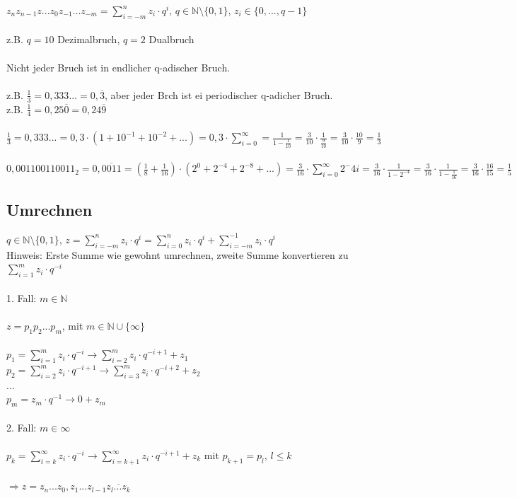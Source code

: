 \documentclass{llncs}
\begin{document}
$z_{n}z_{n-1}z...z_{0}z_{-1}...z_{-m}= \sum_{i=-m}^{n} z_i \cdot q^{i}$, $q \in \mathbb{N} \setminus \{0,1\}$, $z_i \in \{0,...,q-1\}$\\
\\
z.B. $q=10$ Dezimalbruch, $q=2$ Dualbruch\\
\\
Nicht jeder Bruch ist in endlicher q-adischer Bruch.\\
\\
z.B. $\frac{1}{3} = 0,333... = 0,\overline{3}$, aber jeder Brch ist ei periodischer q-adicher Bruch.\\
z.B. $\frac{1}{4} = 0,25\overline{0} = 0,24\overline{9}$\\
\\
$\frac{1}{3} = 0,333... = 0,3 \cdot (1 + 10^{-1}+10^{-2}+...) = 0,3 \cdot \sum_{i=0}^{\infty} = \frac{1}{1-\frac{1}{10}} = \frac{3}{10} \cdot \frac{1}{\frac{9}{10}} = \frac{3}{10} \cdot \frac{10}{9} = \frac{1}{3}$\\
\\
$0,001100110011_2 = 0,\overline{0011} = (\frac{1}{8} + \frac{1}{16}) \cdot (2^0 +2^{-4} + 2^{-8}+...) = \frac{3}{16} \cdot \sum_{i=0}^{\infty} 2^-4i = \frac{3}{16} \cdot \frac{1}{1-2^{-4}} = \frac{3}{16} \cdot \frac{1}{1-\frac{1}{16}} = \frac{3}{16} \cdot \frac{16}{15} = \frac{1}{5}$

\subsection*{Umrechnen}

$q \in \mathbb{N} \setminus \{0,1\}$, $z = \sum_{i=-m}^{n} z_i \cdot q^{i} = \sum_{i=0}^{n} z_i \cdot q^{i} + \sum_{i=-m}^{-1} z_i \cdot q^{i}$\\
Hinweis: Erste Summe wie gewohnt umrechnen, zweite Summe konvertieren zu $\sum_{i=1}^{m} z_i \cdot q^{-i}$\\
\\
1. Fall: $m \in \mathbb{N}$\\
\\
$z = p_1p_2...p_m$, mit $m \in \mathbb{N} \cup \{\infty\}$\\
\\
$p_1 = \sum_{i=1}^{m} z_i \cdot q^{-i} \longrightarrow \sum_{i=2}^{m} z_i \cdot q^{-i+1} + z_1$\\
$p_2 = \sum_{i=2}^{m} z_i \cdot q^{-i+1} \longrightarrow \sum_{i=3}^{m} z_i \cdot q^{-i+2} + z_2$\\
...\\
$p_m = z_m \cdot q^{-1} \longrightarrow 0 + z_m$\\
\\
2. Fall: $m \in \infty$\\
\\
$p_k = \sum_{i=k}^{\infty} z_{i} \cdot q^{-i} \longrightarrow \sum_{i=k+1}^{\infty} z_{i} \cdot q^{-i+1} + z_{k}$ mit $p_{k+1} = p_{l}$, $l \leq k$\\
\\
$\Rightarrow z = z_{n}...z_{0},z_{1}...z_{l-1}\overline{z_{l}...z_{k}}$
\end{document}
